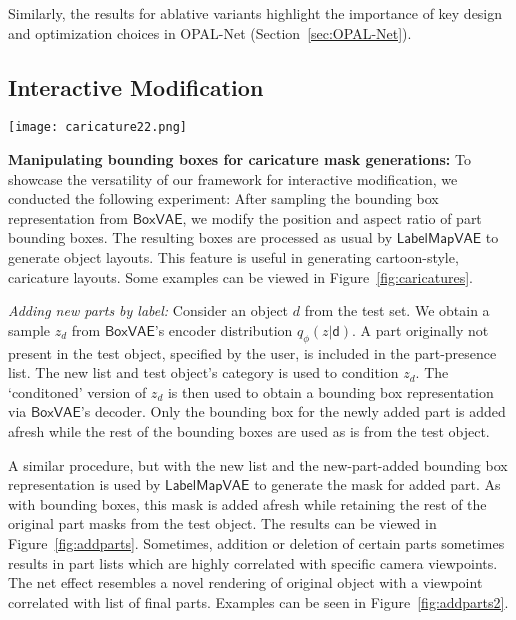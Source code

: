 \documentclass[runningheads]{llncs}
\begin{document}
Similarly, the results for ablative variants highlight the importance of key design and optimization choices in OPAL-Net (Section~\ref{sec:OPAL-Net}).

\subsection{Interactive Modification}

\begin{figure*}[!ht]
  \centering
  \texttt{[image: caricature22.png]}
  \caption{An illustration of interactive modification. For each object, the figure on the left is generated by OPAL-Net unaltered. The figure on the right represents the layout generated when bounding boxes of certain parts in the object are altered in an exaggerated manner. Note the unusually large head of \texttt{bird}, unusually large ears of \texttt{person} and the unusually large fuselage of \texttt{airplane}.}
  \label{fig:caricatures}
\end{figure*}

\noindent \textbf{Manipulating bounding boxes for caricature mask generations:} To showcase the versatility of our framework for interactive modification, we conducted the following experiment: After sampling the bounding box representation from $\mathsf{BoxVAE}$, we modify the position and aspect ratio of part bounding boxes. The resulting boxes are processed as usual by $\mathsf{LabelMapVAE}$ to generate object layouts. This feature is useful in generating cartoon-style, caricature layouts. Some examples can be viewed in Figure~\ref{fig:caricatures}.

\noindent \textit{Adding new parts by label:} Consider an object $d$ from the test set. We obtain a sample $z_d$ from $\mathsf{BoxVAE}$'s encoder distribution $q_{\phi}(z|\mathsf{d})$. A part originally not present in the test object, specified by the user, is included in the part-presence list. The new list and test object's category is used to condition $z_d$. The `conditoned' version of $z_d$ is then used to obtain a bounding box representation via $\mathsf{BoxVAE}$'s decoder. Only the bounding box for the newly added part is added afresh while the rest of the bounding boxes are used as is from the test object.

A similar procedure, but with the new list and the new-part-added bounding box representation is used by $\mathsf{LabelMapVAE}$ to generate the mask for added part. As with bounding boxes, this mask is added afresh while retaining the rest of the original part masks from the test object. The results can be viewed in Figure~\ref{fig:addparts}. Sometimes, addition or deletion of certain parts sometimes results in part lists which are highly correlated with specific camera viewpoints. The net effect resembles a novel rendering of original object with a viewpoint correlated with list of final parts. Examples can be seen in Figure~\ref{fig:addparts2}.
\end{document}
